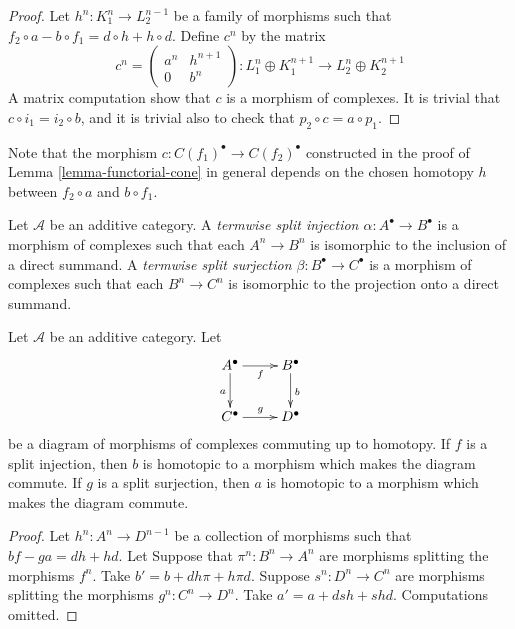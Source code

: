 \begin{proof}
Let $h^n : K_1^n \to L_2^{n - 1}$ be a family of morphisms such that
$f_2 \circ a - b \circ f_1 = d \circ h + h \circ d$.
Define $c^n$ by the matrix
$$
c^n =
\left(
\begin{matrix}
a^n & h^{n + 1} \\
0 & b^n
\end{matrix}
\right) :
L_1^n \oplus K_1^{n + 1} \to L_2^n \oplus K_2^{n + 1}
$$
A matrix computation show that $c$ is a morphism of complexes.
It is trivial that $c \circ i_1 = i_2 \circ b$, and it is
trivial also to check that $p_2 \circ c = a \circ p_1$.
\end{proof}

\noindent
Note that the morphism $c : C(f_1)^\bullet \to C(f_2)^\bullet$
constructed in the
proof of Lemma \ref{lemma-functorial-cone} in general depends on the
chosen homotopy $h$ between $f_2 \circ a$ and $b \circ f_1$.

\begin{definition}
\label{definition-termwise-split-map}
Let $\mathcal{A}$ be an additive category.
A {\it termwise split injection $\alpha : A^\bullet \to B^\bullet$}
is a morphism of complexes such that each $A^n \to B^n$
is isomorphic to the inclusion of a direct summand.
A {\it termwise split surjection $\beta : B^\bullet \to C^\bullet$}
is a morphism of complexes such that each $B^n \to C^n$
is isomorphic to the projection onto a direct summand.
\end{definition}

\begin{lemma}
\label{lemma-make-commute-map}
Let $\mathcal{A}$ be an additive category.
Let
$$
\xymatrix{
A^\bullet \ar[r]_f \ar[d]_a & B^\bullet \ar[d]^b \\
C^\bullet \ar[r]^g & D^\bullet
}
$$
be a diagram of morphisms of complexes commuting up to homotopy.
If $f$ is a split injection, then $b$ is homotopic to a
morphism which makes the diagram commute.
If $g$ is a split surjection, then $a$ is homotopic to a
morphism which makes the diagram commute.
\end{lemma}

\begin{proof}
Let $h^n : A^n \to D^{n - 1}$ be a collection of morphisms
such that $bf - ga = dh + hd$. Let
Suppose that $\pi^n : B^n \to A^n$
are morphisms splitting the morphisms $f^n$.
Take $b' = b + dh\pi + h\pi d$.
Suppose $s^n : D^n \to C^n$ are morphisms splitting the morphisms
$g^n : C^n \to D^n$. Take $a' = a + dsh + shd$.
Computations omitted.
\end{proof}



